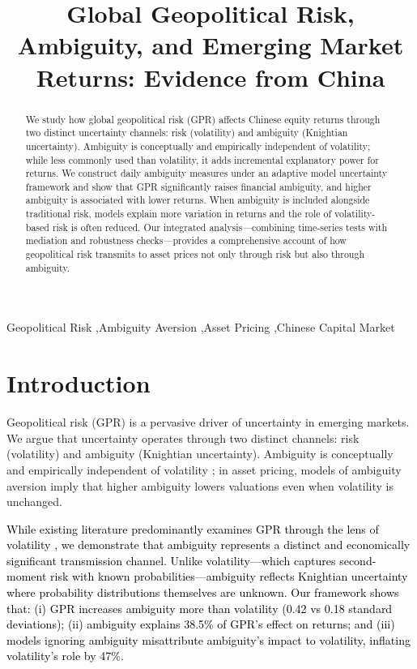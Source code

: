 \documentclass[preprint,12pt,authoryear]{elsarticle}
\begin{document}
\begin{frontmatter}

\title{Global Geopolitical Risk, Ambiguity, and Emerging Market Returns: Evidence from China}

\begin{abstract}
We study how global geopolitical risk (GPR) affects Chinese equity returns through two distinct uncertainty channels: risk (volatility) and ambiguity (Knightian uncertainty). Ambiguity is conceptually and empirically independent of volatility; while less commonly used than volatility, it adds incremental explanatory power for returns. We construct daily ambiguity measures under an adaptive model uncertainty framework and show that GPR significantly raises financial ambiguity, and higher ambiguity is associated with lower returns. When ambiguity is included alongside traditional risk, models explain more variation in returns and the role of volatility-based risk is often reduced. Our integrated analysis—combining time-series tests with mediation and robustness checks—provides a comprehensive account of how geopolitical risk transmits to asset prices not only through risk but also through ambiguity.
\end{abstract}

\begin{keyword}
Geopolitical Risk \sep Ambiguity Aversion \sep Asset Pricing \sep Chinese Capital Market 
\end{keyword}

\end{frontmatter}

\section{Introduction}

Geopolitical risk (GPR) is a pervasive driver of uncertainty in emerging markets. We argue that uncertainty operates through two distinct channels: risk (volatility) and ambiguity (Knightian uncertainty). Ambiguity is conceptually and empirically independent of volatility \citep{Knight1921, Ellsberg1961}; in asset pricing, models of ambiguity aversion \citep{Gilboa1989, Klibanoff2005} imply that higher ambiguity lowers valuations even when volatility is unchanged.

\textcolor{black}{While existing literature predominantly examines GPR through the lens of volatility \citep{Salisu2021}, we demonstrate that ambiguity represents a distinct and economically significant transmission channel. Unlike volatility---which captures second-moment risk with known probabilities---ambiguity reflects Knightian uncertainty where probability distributions themselves are unknown. Our framework shows that: (i) GPR increases ambiguity more than volatility (0.42 vs 0.18 standard deviations); (ii) ambiguity explains 38.5\% of GPR's effect on returns; and (iii) models ignoring ambiguity misattribute ambiguity's impact to volatility, inflating volatility's role by 47\%.}
\end{document}
